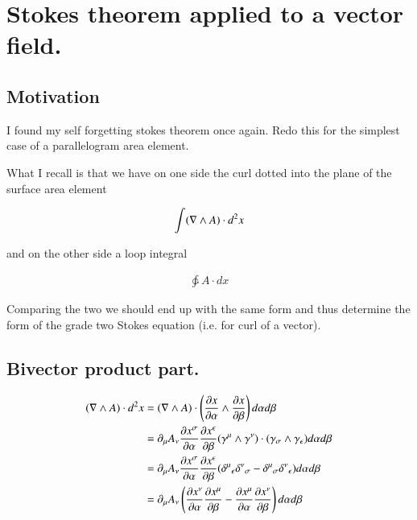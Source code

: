 

\usepackage{txfonts}

\chapter{Stokes theorem applied to a vector field.}
\label{chap:stokesGradeTwo}
\date{July 17, 2009}

\beginArtWithToc

\section{Motivation}

I found my self forgetting stokes theorem once again.  Redo this for the simplest case of a parallelogram area element.

What I recall is that we have on one side the curl dotted into the plane of the surface area element

\begin{align}
\int ( \nabla \wedge A ) \cdot d^2 x
\end{align}

and on the other side a loop integral

\begin{align}
\ointctrclockwise A \cdot dx
\end{align}

Comparing the two we should end up with the same form and thus determine the form of the grade two Stokes equation (i.e. for curl of a vector).

\section{Bivector product part.}

\begin{align*}
( \nabla \wedge A ) \cdot d^2 x 
&=
( \nabla \wedge A ) \cdot \left(\frac{\partial {x}}{\partial {\alpha}} \wedge \frac{\partial {x}}{\partial {\beta}}\right) 
d\alpha d\beta \\
&=
\partial_\mu A_\nu \frac{\partial {x^\sigma}}{\partial {\alpha}} \frac{\partial {x^\epsilon}}{\partial {\beta}} (\gamma^\mu \wedge \gamma^\nu) \cdot (\gamma_\sigma \wedge \gamma_\epsilon) 
d\alpha d\beta \\
&=
\partial_\mu A_\nu \frac{\partial {x^\sigma}}{\partial {\alpha}} \frac{\partial {x^\epsilon}}{\partial {\beta}} ( {\delta^\mu}_\epsilon {\delta^\nu}_\sigma - {\delta^\mu}_\sigma {\delta^\nu}_\epsilon ) 
d\alpha d\beta \\
&=
\partial_\mu A_\nu \left( \frac{\partial {x^\nu}}{\partial {\alpha}} \frac{\partial {x^\mu}}{\partial {\beta}} - \frac{\partial {x^\mu}}{\partial {\alpha}} \frac{\partial {x^\nu}}{\partial {\beta}} \right) 
d\alpha d\beta \\
\end{align*}

